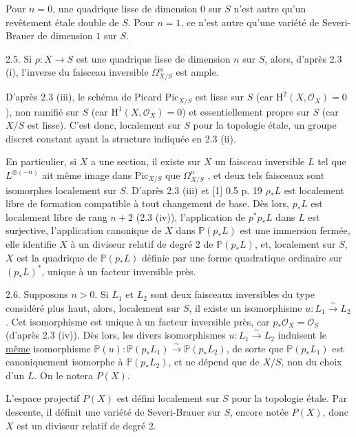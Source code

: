 Pour $n = 0$, une quadrique lisse de dimension $0$ sur $S$ n'est autre qu'un revêtement étale double de $S$. Pour $n = 1$, ce n'est autre qu'une variété de Severi-Brauer de dimension $1$ sur $S$.

2.5. Si $\rho : X \longrightarrow S$ est une quadrique lisse de dimension $n$ sur $S$, alors, d'après 2.3 (i), l'inverse du faisceau inversible $\Omega^n_{X/S}$ est ample.



D'après 2.3 (iii), le schéma de Picard $\mathrm{Pic}_{X/S}$ est lisse sur $S$ (car $\mathrm{H}^2(X,\mathcal{O}_X) = 0$), non ramifié sur $S$ (car $\mathrm{H}^1(X,\mathcal{O}_X) = 0$) et essentiellement propre sur $S$ (car $X/S$ est lisse). C'est donc, localement sur $S$ pour la topologie étale, un groupe discret constant ayant la structure indiquée en 2.3 (ii).

En particulier, si $X$ a une section, il existe sur $X$ un faisceau inversible $L$ tel que $L^{\otimes(-n)}$ ait même image dans $\mathrm{Pic}_{X/S}$ que $\Omega^n_{X/S}$ , et deux tels faisceaux sont isomorphes localement sur $S$. D'après 2.3 (iii) et [1] 0.5 p. 19 $\rho_*L$ est localement libre de formation compatible à tout changement de base. Dès lors, $p_*L$ est localement libre de rang $n + 2$ (2.3 (iv)), l'application de $p^*p_*L$ dans $L$ est surjective, l'application canonique de $X$ dans $\mathbb{P}(p_*L)$ est une immersion fermée, elle identifie $X$ à un diviseur relatif de degré 2 de $\mathbb{P}(p_*L)$, et, localement sur $S$, $X$ est la quadrique de $\mathbb{P}(p_*L)$ définie par une forme quadratique ordinaire sur $(p_*L)^*$, unique à un facteur inversible près.

2.6. Supposons $n > 0$. Si $L_1$ et $L_2$ sont deux faisceaux inversibles du type considéré plus haut, alors, localement sur $S$, il existe un isomorphisme $u : L_1 \stackrel{\sim}{\longrightarrow} L_2$. Cet isomorphisme est unique à un facteur inversible près, car $p_*\mathcal{O}_X = \mathcal{O}_S$ (d'après 2.3 (iv)). Dès lors, les divers isomorphismes $u : L_1 \stackrel{\sim}{\longrightarrow} L_2$ induisent le \underline{même} isomorphisme $\mathbb{P}(u): \mathbb{P}(p_*L_1) \stackrel{\sim}{\longrightarrow} \mathbb{P}(p_*L_2)$, de sorte que $\mathbb{P}(p_*L_1)$ est canoniquement isomorphe à $\mathbb{P}(p_*L_2)$, et ne dépend que de $X/S$, non du choix d'un $L$. On le notera $P(X)$.



L'espace projectif $P(X)$ est défini localement sur $S$ pour la topologie étale. Par descente, il définit une variété de Severi-Brauer sur $S$, encore notée $P(X)$, donc $X$ est un diviseur relatif de degré 2.

